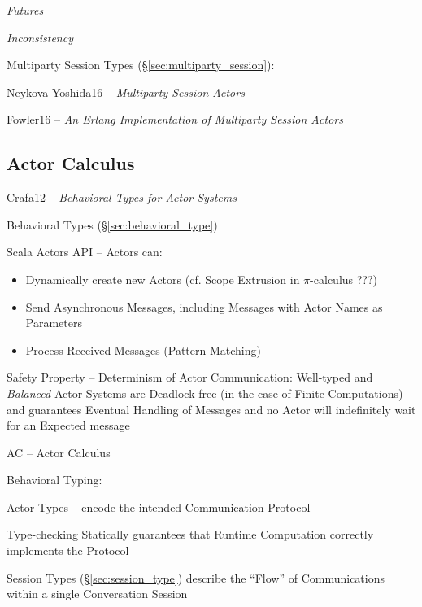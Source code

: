\emph{Futures}

\emph{Inconsistency}


\asterism


Multiparty Session Types (\S\ref{sec:multiparty_session}):

Neykova-Yoshida16 -- \emph{Multiparty Session Actors}

Fowler16 -- \emph{An Erlang Implementation of Multiparty Session
  Actors}



\subsection{Actor Calculus}\label{sec:actor_calculus}

\begingroup

\newcommand{\react}{\mathsf{react}}
\newcommand{\val}{\mathsf{val\;}}
\newcommand{\actor}{\mathsf{actor}}

Crafa12 -- \emph{Behavioral Types for Actor Systems}

Behavioral Types (\S\ref{sec:behavioral_type})

Scala Actors API -- Actors can:
\begin{itemize}
  \item Dynamically create new Actors (cf. Scope Extrusion in
    $\pi$-calculus ???)
  \item Send Asynchronous Messages, including Messages with Actor
    Names as Parameters
  \item Process Received Messages (Pattern Matching)
\end{itemize}

Safety Property -- Determinism of Actor Communication: Well-typed and
\emph{Balanced} Actor Systems are Deadlock-free (in the case of Finite
Computations) and guarantees Eventual Handling of Messages and no
Actor will indefinitely wait for an Expected message

AC -- Actor Calculus

Behavioral Typing:

Actor Types -- encode the intended Communication Protocol

Type-checking Statically guarantees that Runtime Computation correctly
implements the Protocol

Session Types (\S\ref{sec:session_type}) describe the ``Flow'' of
Communications within a single Conversation Session

